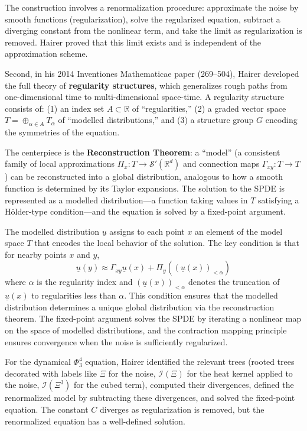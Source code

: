 The construction involves a renormalization procedure: approximate the noise by smooth functions (regularization), solve the regularized equation, subtract a diverging constant from the nonlinear term, and take the limit as regularization is removed. Hairer proved that this limit exists and is independent of the approximation scheme.

Second, in his 2014 Inventiones Mathematicae paper (269--504), Hairer developed the full theory of \textbf{regularity structures}, which generalizes rough paths from one-dimensional time to multi-dimensional space-time. A regularity structure consists of: (1) an index set $A \subset \mathbb{R}$ of ``regularities,'' (2) a graded vector space $T = \oplus_{\alpha\in A} T_\alpha$ of ``modelled distributions,'' and (3) a structure group $G$ encoding the symmetries of the equation.

The centerpiece is the \textbf{Reconstruction Theorem}: a ``model'' (a consistent family of local approximations $\Pi_x: T\to\mathcal{S}'(\mathbb{R}^d)$ and connection maps $\Gamma_{xy}: T\to T$) can be reconstructed into a global distribution, analogous to how a smooth function is determined by its Taylor expansions. The solution to the SPDE is represented as a modelled distribution---a function taking values in $T$ satisfying a H\"{o}lder-type condition---and the equation is solved by a fixed-point argument.

The modelled distribution $\underline{u}$ assigns to each point $x$ an element of the model space $T$ that encodes the local behavior of the solution. The key condition is that for nearby points $x$ and $y$,
\[
\underline{u}(y) \approx \Gamma_{xy} \underline{u}(x) + \Pi_y((\underline{u}(x))_{<\alpha})
\]
where $\alpha$ is the regularity index and $(\underline{u}(x))_{<\alpha}$ denotes the truncation of $\underline{u}(x)$ to regularities less than $\alpha$. This condition ensures that the modelled distribution determines a unique global distribution via the reconstruction theorem. The fixed-point argument solves the SPDE by iterating a nonlinear map on the space of modelled distributions, and the contraction mapping principle ensures convergence when the noise is sufficiently regularized.

For the dynamical $\Phi^4_3$ equation, Hairer identified the relevant trees (rooted trees decorated with labels like $\Xi$ for the noise, $\mathcal{I}(\Xi)$ for the heat kernel applied to the noise, $\mathcal{I}(\Xi^3)$ for the cubed term), computed their divergences, defined the renormalized model by subtracting these divergences, and solved the fixed-point equation. The constant $C$ diverges as regularization is removed, but the renormalized equation has a well-defined solution.

